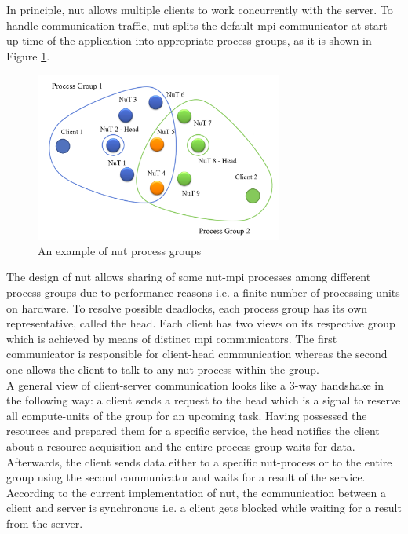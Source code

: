 In principle, \acrshort{nut} allows multiple clients to work concurrently with the server. To handle communication traffic, \acrshort{nut} splits the default \acrshort{mpi} communicator at start-up time of the application into appropriate process groups, as it is shown in Figure \ref{fig:introduction-nut-process-groups}.\\


\begin{figure}[!h]
  \centering
  \includegraphics[width=0.725\textwidth]{figures/introduction-nut-process-groups.png}
\caption{An example of \acrshort{nut} process groups}
\label{fig:introduction-nut-process-groups}
\end{figure}


The design of \acrshort{nut} allows sharing of some \acrshort{nut}-\acrshort{mpi} processes among different process groups due to performance reasons i.e. a finite number of processing units on hardware. To resolve possible deadlocks, each process group has its own representative, called the head. Each client has two views on its respective group which is achieved by means of distinct \acrshort{mpi} communicators. The first communicator is responsible for client-head communication whereas the second one allows the client to talk to any \acrshort{nut} process within the group.\\



A general view of client-server communication looks like a 3-way handshake in the following way: a client sends a request to the head which is a signal to reserve all compute-units of the group for an upcoming task. Having possessed the resources and prepared them for a specific service, the head notifies the client about a resource acquisition and the entire process group waits for data. Afterwards, the client sends data either to a specific \acrshort{nut}-process or to the entire group using the second communicator and waits for a result of the service. According to the current implementation of \acrshort{nut}, the communication between a client and server is synchronous i.e. a client gets blocked while waiting for a result from the server. \\


